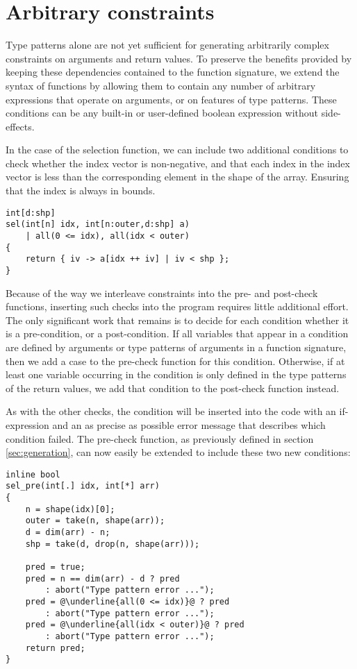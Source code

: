 \section{Arbitrary constraints}

Type patterns alone are not yet sufficient for generating arbitrarily complex constraints on arguments and return values.
To preserve the benefits provided by keeping these dependencies contained to the function signature, we extend the syntax of functions by allowing them to contain any number of arbitrary expressions that operate on arguments, or on features of type patterns.
These conditions can be any built-in or user-defined boolean expression without side-effects.

In the case of the selection function, we can include two additional conditions to check whether the index vector is non-negative, and that each index in the index vector is less than the corresponding element in the shape of the array.
Ensuring that the index is always in bounds.
\begin{lstlisting}
int[d:shp]
sel(int[n] idx, int[n:outer,d:shp] a)
    | all(0 <= idx), all(idx < outer)
{
    return { iv -> a[idx ++ iv] | iv < shp };
}
\end{lstlisting}

\noindent
Because of the way we interleave constraints into the pre- and post-check functions, inserting such checks into the program requires little additional effort.
The only significant work that remains is to decide for each condition whether it is a pre-condition, or a post-condition.
If all variables that appear in a condition are defined by arguments or type patterns of arguments in a function signature, then we add a case to the pre-check function for this condition.
Otherwise, if at least one variable occurring in the condition is only defined in the type patterns of the return values, we add that condition to the post-check function instead.

As with the other checks, the condition will be inserted into the code with an if-expression and an as precise as possible error message that describes which condition failed.
The pre-check function, as previously defined in section \ref{sec:generation}, can now easily be extended to include these two new conditions:
\begin{lstlisting}[escapechar=@]
inline bool
sel_pre(int[.] idx, int[*] arr)
{
    n = shape(idx)[0];
    outer = take(n, shape(arr));
    d = dim(arr) - n;
    shp = take(d, drop(n, shape(arr)));

    pred = true;
    pred = n == dim(arr) - d ? pred
        : abort("Type pattern error ...");
    pred = @\underline{all(0 <= idx)}@ ? pred
        : abort("Type pattern error ...");
    pred = @\underline{all(idx < outer)}@ ? pred
        : abort("Type pattern error ...");
    return pred;
}
\end{lstlisting}

